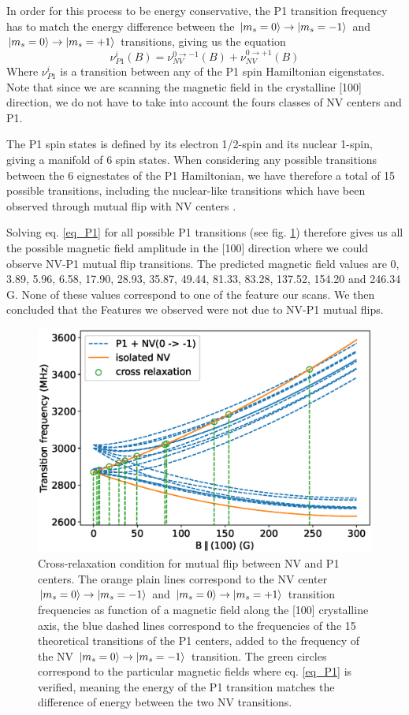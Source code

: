 \documentclass{article}
\begin{document}
In order for this process to be energy conservative, the P1 transition frequency has to match the energy difference between the $\ket{m_s=0} \to \ket{m_s=-1}$ and $\ket{m_s=0} \to \ket{m_s=+1}$ transitions, giving us the equation \begin{equation}
\label{eq_P1}
\nu^i_{P1}(B)=\nu^{0 \to -1}_{NV}(B)+\nu^{0 \to +1}_{NV}(B)
\end{equation}
Where $\nu^i_{P1}$ is a transition between any of the P1 spin Hamiltonian eigenstates. Note that since we are scanning the magnetic field in the crystalline [100] direction, we do not have to take into account the fours classes of NV centers and P1.

The P1 spin states is defined by its  electron 1/2-spin and its nuclear 1-spin, giving a manifold of 6 spin states. When considering any possible transitions between the 6 eignestates of the P1 Hamiltonian, we have therefore a total of 15 possible transitions, including the nuclear-like transitions which have been observed through mutual flip with NV centers \citep{alfasi2019detection}. 

Solving eq. \ref{eq_P1} for all possible P1 transitions (see fig. \ref{fig_P1}) therefore gives us all the possible magnetic field amplitude in the [100] direction where we could observe NV-P1 mutual flip transitions. The predicted magnetic field values are 0, 3.89, 5.96, 6.58, 17.90, 28.93, 35.87, 49.44, 81.33, 83.28, 137.52, 154.20 and 246.34 G. None of these values correspond to one of the feature our scans. We then concluded that the Features we observed were not due to NV-P1 mutual flips. 
\begin{figure}
\label{fig_P1}
\includegraphics[scale=.6]{Transis_P1}
\caption{Cross-relaxation condition for mutual flip between NV and P1 centers. The orange plain lines correspond to the NV center $\ket{m_s=0} \to \ket{m_s=-1}$ and $\ket{m_s=0} \to \ket{m_s=+1}$ transition frequencies as function of a magnetic field along the [100] crystalline axis, the blue dashed lines correspond to the frequencies of the 15 theoretical transitions of the P1 centers, added to the frequency of the NV $\ket{m_s=0} \to \ket{m_s=-1}$ transition. The green circles correspond to the particular magnetic fields where eq. \ref{eq_P1} is verified, meaning the energy of the P1 transition matches the difference of energy between the two NV transitions.}
\end{figure}

\end{document}
